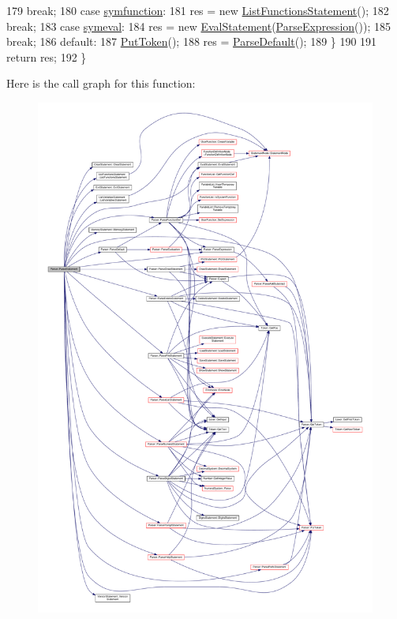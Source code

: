 \begin{DoxyCode}
179         \textcolor{keywordflow}{break};
180     \textcolor{keywordflow}{case} \hyperlink{lex_8h_a7feef761cd73fac6e25b8bb80d2c4e54ac0ac9c237f5df41937de351d33daeef4}{symfunction}:
181         res = \textcolor{keyword}{new} \hyperlink{classListFunctionsStatement}{ListFunctionsStatement}();
182         \textcolor{keywordflow}{break};
183     \textcolor{keywordflow}{case} \hyperlink{lex_8h_a7feef761cd73fac6e25b8bb80d2c4e54a57c965a74493e9751bca9cc3735b0365}{symeval}:
184         res = \textcolor{keyword}{new} \hyperlink{classEvalStatement}{EvalStatement}(\hyperlink{classParser_ae46b0a87abe76f40ae117c5bdcb2f29d}{ParseExpression}());
185         \textcolor{keywordflow}{break};
186     \textcolor{keywordflow}{default}:
187         \hyperlink{classParser_adb5c3a188b36f7ecb198ae30f06338b3}{PutToken}();
188         res = \hyperlink{classParser_aca8329fb5ee4812398144fd1d647fe39}{ParseDefault}();
189     \}
190 
191     \textcolor{keywordflow}{return} res;
192 \}
\end{DoxyCode}


Here is the call graph for this function\+:\nopagebreak
\begin{figure}[H]
\begin{center}
\leavevmode
\includegraphics[width=350pt]{classParser_a370277018ad3e0e157a8ff5849892f7d_cgraph}
\end{center}
\end{figure}




